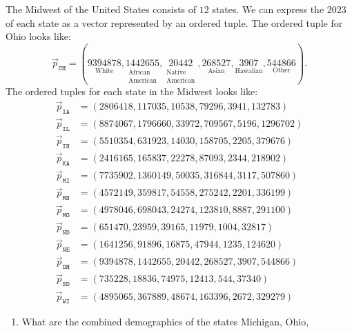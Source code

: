 \documentclass{ximera}
\begin{document}
\begin{example} %
  The Midwest of the United States consists of $12$ states. We can
  express the $2023$
  of each state as a vector represented by an ordered tuple. The
  ordered tuple for Ohio looks like:
  \[
  \vec{p}_{\texttt{OH}} = (\underset{\text{White}}{9394878},\underset{\begin{smallmatrix}\text{African}\\ \text{American}\end{smallmatrix}}{1442655},\underset{\begin{smallmatrix}\text{Native}\\\text{American}\end{smallmatrix}}{20442},\underset{\text{Asian}}{268527},\underset{\text{Hawaiian}}{3907},\underset{\text{Other}}{544866}).
  \]
  The ordered tuples for each state in the Midwest looks like:
\begin{align*}
  \vec{p}_{\texttt{IA}} &= (2806418,117035,10538,79296,3941,132783)\\
  \vec{p}_{\texttt{IL}} &= (8874067,1796660,33972,709567,5196,1296702)\\
  \vec{p}_{\texttt{IN}} &= (5510354,631923,14030,158705,2205,379676)\\
  \vec{p}_{\texttt{KA}} &= (2416165,165837,22278,87093,2344,218902)\\
  \vec{p}_{\texttt{MI}} &= (7735902,1360149,50035,316844,3117,507860)\\
  \vec{p}_{\texttt{MN}} &= (4572149,359817,54558,275242,2201,336199)\\
  \vec{p}_{\texttt{MO}} &= (4978046,698043,24274,123810,8887,291100)\\
  \vec{p}_{\texttt{ND}} &= (651470,23959,39165,11979,1004,32817)\\
  \vec{p}_{\texttt{NE}} &= (1641256,91896,16875,47944,1235,124620)\\
  \vec{p}_{\texttt{OH}} &= (9394878,1442655,20442,268527,3907,544866)\\
  \vec{p}_{\texttt{SD}} &= (735228,18836,74975,12413,544,37340)\\
  \vec{p}_{\texttt{WI}} &= (4895065,367889,48674,163396,2672,329279)
\end{align*}
\begin{enumerate}
\item What are the combined demographics of the states Michigan, Ohio,

\end{enumerate}
\end{example}
\end{document}
